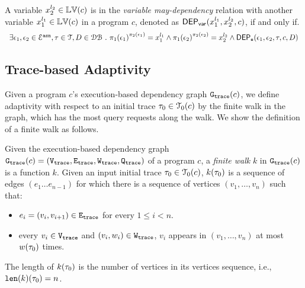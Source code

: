 \begin{defn}
  \label{def:var_dep}
  A variable ${x}_2^{l_2} \in \mathbb{LV}(c)$ is in the \emph{variable may-dependency} relation with another
  variable ${x}_1^{l_1} \in \mathbb{LV}(c)$ in a program ${c}$, denoted as 
  $\mathsf{DEP_{var}}({x}_1^{l_1}, {x}_2^{l_2}, {c})$, if and only if.
\[
  \begin{array}{l}
\exists \event_1, \event_2 \in \eventset^{\asn}, \trace \in \mathcal{T} , D \in \dbdom \st
\pi_{1}{(\event_1)}^{\pi_{2}{(\event_1)}} = {x}_1^{l_1}
\land
\pi_{1}{(\event_2)}^{\pi_{2}{(\event_2)}} = {x}_2^{l_2}%
\land 
\eventdep(\event_1, \event_2, \trace, c, D) 
  \end{array}
\]  %
  \end{defn}
\subsection{Trace-based Adaptivity}
Given 
a program $c$'s execution-based dependency graph 
$\mathtt{{G_{trace}}}({c})$,
we define adaptivity 
with respect to an initial trace $\mathtt{\tau}_0 \in \mathcal{T}_0(c)$ by the finite walk in the graph, which has the most query requests along the walk.
We show the definition of a finite walk as follows.

\begin{defn}
\label{def:finitewalk}
Given the execution-based dependency graph $\mathtt{{G_{trace}}}({c}) = (\mathtt{{V_{trace}}}, \mathtt{{E_{trace}}}, \mathtt{{W_{trace}}}, \mathtt{{Q_{trace}}})$ of a program $c$, a \emph{finite walk} $k$ in $\mathtt{{G_{trace}}}({c})$ is a function $k$.
Given an input initial trace $\mathtt{\tau}_0 \in \mathcal{T}_0(c)$, $k(\mathtt{\tau}_0)$ is a sequence of edges $(e_1 \ldots e_{n - 1})$ 
for which there is a sequence of vertices $(v_1, \ldots, v_{n})$ such that:
\begin{itemize}
\item $e_i = (v_{i},v_{i + 1}) \in \mathtt{{E_{trace}}}$ for every $1 \leq i < n$.
\item every $v_i \in \mathtt{{V_{trace}}}$ and $(v_i, w_i) \in \mathtt{{W_{trace}}}$, $v_i$ appears in $(v_1, \ldots, v_{n})$ at most $w(\mathtt{\tau}_0)$ times.  
\end{itemize}
The length of $k(\mathtt{\tau}_0)$ is the number of vertices in its vertices sequence, i.e., $\mathtt{len}(k)(\mathtt{\tau}_0) = n$.
\end{defn} 

